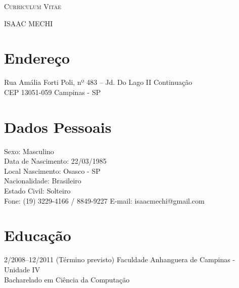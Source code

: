 \documentclass[a4paper]{article}
\begin{document}
\pagestyle{empty}

\begin{center}
\huge{\textsc{Curriculum Vitae \small \LaTeXe }}
\vspace{\baselineskip}

\Large{\textsc{ISAAC MECHI}}
\end{center}
\vspace{1.5\baselineskip}

\section{Endereço}

\begin{flushleft}
	Rua Amália Forti Poli, nº 483 – Jd. Do Lago II Continuação \\
	CEP 13051-059 Campinas - SP
\end{flushleft}


\section{Dados Pessoais}
\begin{flushleft}
  Sexo: Masculino \\
  Data de Nascimento: 22/03/1985 \\
  Local Nascimento: Osasco - SP \\
  Nacionalidade: Brasileiro \\
  Estado Civil: Solteiro \\
  Fone: (19) 3229-4166 / 8849-9227 E-mail: isaacmechi@gmail.com \\
\end{flushleft}


\section{Educação}
\begin{CV}
\item[2/2008--12/2011 (Término previsto)] Faculdade Anhanguera de Campinas - Unidade IV
\\Bacharelado em Ciência da Computação
\end{CV}
\end{document}
